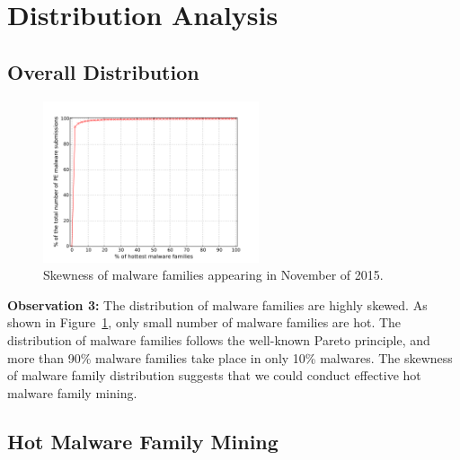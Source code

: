 \section{Distribution Analysis}

\subsection{Overall Distribution}
\begin{figure}[t!]
\begin{center}
\includegraphics[width=2.5in]{figure/cum}
\caption{Skewness of malware families appearing in November of 2015.}
\label{fig:acum}
\end{center}
\end{figure}

{\bf Observation 3:} 
The distribution of malware families are highly skewed. 
As shown in Figure~\ref{fig:acum}, only small number of malware families are hot.
The distribution of malware families follows the well-known Pareto principle, 
and more than 90\% malware families take place in only 10\% malwares. 
The skewness of malware family distribution suggests that we could conduct effective hot malware family mining. 



\subsection{Hot Malware Family Mining}
\label{sec:hot}

